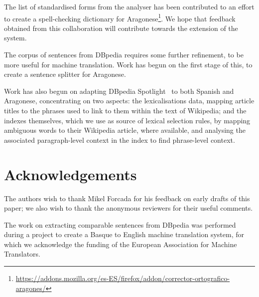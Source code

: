 \documentclass[10pt, a4paper]{article}
\begin{document}
  The list of standardised forms from the analyser has been contributed to an effort to create a spell-checking dictionary for Aragonese\footnote{\url{https://addons.mozilla.org/es-ES/firefox/addon/corrector-ortografico-aragones/}}. We hope that feedback obtained from this collaboration will contribute towards the extension of the system.

  The corpus of sentences from DBpedia requires some further refinement, to be more useful for machine translation. Work has begun on the first stage of this, to create a sentence splitter for Aragonese.

  Work has also begun on adapting DBpedia Spotlight~\cite{spotlight} to both Spanish and Aragonese, concentrating on two aspects: the lexicalisations data, mapping article titles to the phrases used to link to them within the text of Wikipedia; and the indexes themselves, which we use as source of lexical selection rules, by mapping ambiguous words to their Wikipedia article, where available, and analysing the associated paragraph-level context in the index to find phrase-level context. 

  \section{Acknowledgements}

  The authors wish to thank Mikel Forcada for his feedback on early drafts of this paper; we also wish to thank the anonymous reviewers for their useful comments.

  The work on extracting comparable sentences from DBpedia was performed during a project to create a Basque to English machine translation system, for which we acknowledge the funding of the European Association for Machine Translators.



  
\end{document}
